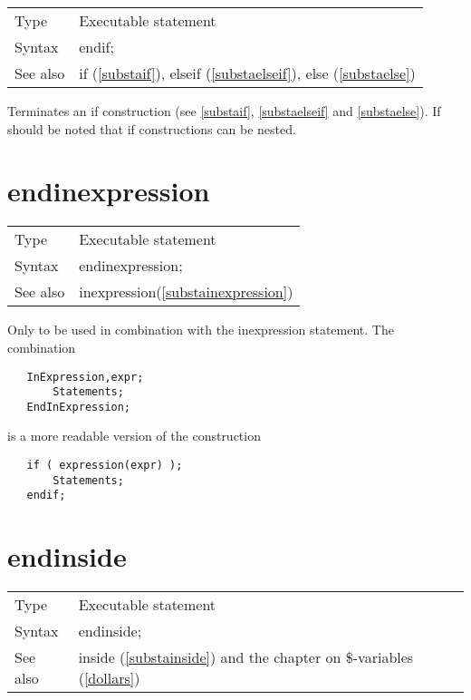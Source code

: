 \noindent \begin{tabular}{ll}
Type & Executable statement\\
Syntax & endif;
\\ See also & if (\ref{substaif}),
              elseif (\ref{substaelseif}),
              else (\ref{substaelse})
\end{tabular} \vspace{4mm}

\noindent Terminates an if construction (see \ref{substaif}, 
\ref{substaelseif} and \ref{substaelse}). If should be noted that 
if 
constructions can be nested.
\vspace{10mm}

 
\section{endinexpression}
\label{substaendinexpression}

\noindent \begin{tabular}{ll}
Type & Executable statement\\
Syntax & endinexpression;
\\ See also & inexpression(\ref{substainexpression})
\end{tabular} \vspace{4mm}

\noindent Only to be used in combination with the 
inexpression statement. The 
combination
\begin{verbatim}
   InExpression,expr;
       Statements;
   EndInExpression;
\end{verbatim}
is a more readable version of the construction
\begin{verbatim}
   if ( expression(expr) );
       Statements;
   endif;
\end{verbatim}
\vspace{10mm}


\section{endinside}
\label{substaendinside}

\noindent \begin{tabular}{ll}
Type & Executable statement\\
Syntax & endinside;
\\ See also & inside (\ref{substainside}) and the chapter on \$-variables 
(\ref{dollars})
\end{tabular}\vspace{4mm}

